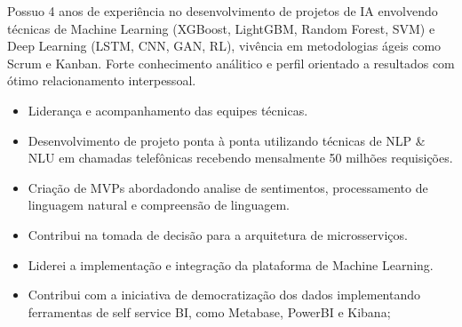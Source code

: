 \documentclass[10pt,a4paper,ragged2e]{altacv}
\begin{document}

\begin{fullwidth}
	\makecvheader
\end{fullwidth}




\justifying
Possuo 4 anos de experiência no desenvolvimento de projetos de IA envolvendo 
técnicas de Machine Learning (XGBoost, LightGBM, Random Forest, SVM) e Deep Learning  
(LSTM, CNN, GAN, RL), vivência em metodologias ágeis como Scrum 
e Kanban. Forte conhecimento análitico e perfil orientado a resultados com ótimo 
relacionamento interpessoal. 


\begin{itemize}
							
	\item Liderança e acompanhamento das equipes técnicas.
	      	      	      	      	      	      	      
	\item Desenvolvimento de projeto ponta à ponta utilizando técnicas de NLP \& NLU 
	      em chamadas telefônicas recebendo mensalmente 50 milhões requisições.
	      	      	      	      	      	      	      
	\item Criação de MVPs abordadondo analise de sentimentos, processamento de linguagem 
	      natural e compreensão de linguagem. 
	      	      	      	      	      	      	      
	\item Contribui na tomada de decisão para a arquitetura de microsserviços.
	      	      	      	      	      	      	      
	\item Liderei a implementação e integração da plataforma de Machine Learning.
	      	      	      	      	      	      	             
	\item Contribui com a iniciativa de democratização dos dados implementando ferramentas
	      de self service BI, como Metabase, PowerBI e Kibana;
	      	      	      	      	      	      	      
\end{itemize}
\end{document}
